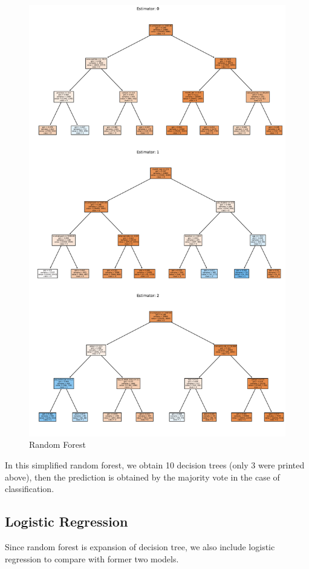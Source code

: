 \documentclass[11pt,a4paper]{article}
\begin{document}
    \begin{figure}[!ht]
        \centering
        \includegraphics[width = \textwidth]{plot/classification/random_forest.pdf}
        \caption{Random Forest}
        \label{fig:random_forest}
    \end{figure}
    
    \newpage
    \noindent
    In this simplified random forest, we obtain 10 decision trees (only 3 were printed above), then the prediction is obtained by the majority vote in the case of classification.
    
    
    \subsection{Logistic Regression} \label{logistic_regression}
    Since random forest is expansion of decision tree, we also include logistic regression to compare with former two models.
    
\end{document}
